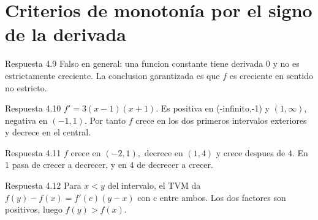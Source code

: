 \documentclass[10pt,a4paper,oneside,openany]{book}
\begin{document}
\section{Criterios de monotonía por el signo de la derivada}
\begin{PSevenAnswerFixed}{Respuesta 4.9}
Falso en general: una funcion constante tiene derivada \(0\) y no es estrictamente creciente. La conclusion garantizada es que \(f\) es creciente en sentido no estricto.
\end{PSevenAnswerFixed}
\begin{PSevenAnswerFixed}{Respuesta 4.10}
\(f'=3(x-1)(x+1)\). Es positiva en (-infinito,-1) y \((1,\infty ),\) negativa en \((-1,1)\). Por tanto \(f\) crece en los dos primeros intervalos exteriores y decrece en el central.
\end{PSevenAnswerFixed}
\begin{PSevenAnswerFixed}{Respuesta 4.11}
\(f\) crece en \((-2,1),\) decrece en \((1,4)\) y crece despues de \(4\). En \(1\) pasa de crecer a decrecer, y en \(4\) de decrecer a crecer.
\end{PSevenAnswerFixed}
\begin{PSevenAnswerFixed}{Respuesta 4.12}
Para \(x<y\) del intervalo, el TVM da \(f(y)-f(x)=f'(c)(y-x)\) con c entre ambos. Los dos factores son positivos, luego \(f(y)>f(x)\).
\end{PSevenAnswerFixed}
\end{document}
